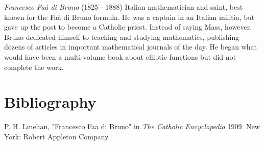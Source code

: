 \documentclass[12pt]{article}
\begin{document}
\emph{Francesco Fa\`a di Bruno} (1825 - 1888) Italian mathematician and saint, best known for the Fa\`a di Bruno formula. He was a captain in an Italian militia, but gave up the post to become a Catholic priest. Instead of saying Mass, however, Bruno dedicated himself to teaching and studying mathematics, publishing dozens of articles in important mathematical journals of the day. He began what would have been a multi-volume book about elliptic functions but did not complete the work.

\section{Bibliography}

P. H. Linehan, "Francesco Faa di Bruno" in {\it The Catholic Encyclopedia} 1909. New York: Robert Appleton Company
\end{document}
